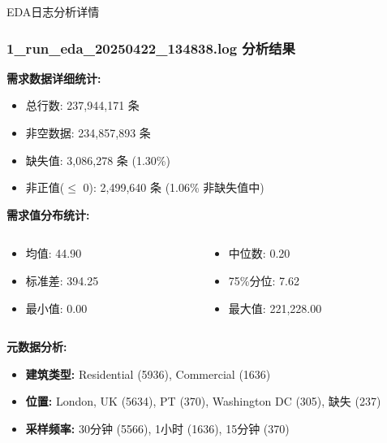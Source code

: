 \documentclass{beamer} %
\begin{document}
\begin{frame}{EDA日志分析详情}
    \frametitle{1\_run\_eda\_20250422\_134838.log 分析结果}
    \textbf{需求数据详细统计:}
    \begin{itemize}
        \item 总行数: 237,944,171 条
        \item 非空数据: 234,857,893 条
        \item 缺失值: 3,086,278 条 (1.30\%)
        \item 非正值($\leq$ 0): 2,499,640 条 (1.06\% 非缺失值中)
    \end{itemize}

    \textbf{需求值分布统计:}
    \begin{columns}
        \begin{column}{0.45\textwidth}
            \begin{itemize}
                \item 均值: 44.90
                \item 标准差: 394.25
                \item 最小值: 0.00
            \end{itemize}
        \end{column}
        \begin{column}{0.45\textwidth}
            \begin{itemize}
                \item 中位数: 0.20
                \item 75\%分位: 7.62
                \item 最大值: 221,228.00
            \end{itemize}
        \end{column}
    \end{columns}
    
    \textbf{元数据分析:}
    \begin{itemize}
        \item \textbf{建筑类型:} Residential (5936), Commercial (1636)
        \item \textbf{位置:} London, UK (5634), PT (370), Washington DC (305), 缺失 (237)
        \item \textbf{采样频率:} 30分钟 (5566), 1小时 (1636), 15分钟 (370)
    \end{itemize}
\end{frame}
\end{document}

